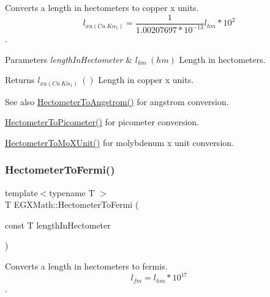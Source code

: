 Converts a length in hectometers to copper x units. \[ l_{xu(Cu\ K\alpha_1)}= \frac{1}{1.00207697*10^{-13}} l_{hm} * 10^{2}\]. 


\begin{DoxyParams}{Parameters}
{\em length\+In\+Hectometer} & $ l_{hm}\ (hm)$ Length in hectometers. \\
\hline
\end{DoxyParams}
\begin{DoxyReturn}{Returns}
$ l_{xu(Cu\ K\alpha_1)}\ ()$ Length in copper x units. 
\end{DoxyReturn}
\begin{DoxySeeAlso}{See also}
\mbox{\hyperlink{group___e_g_x_math-_conversions-_length_conversions-_s_i-_hectometer-_non-_s_i_gad1296c0169aa8a99802a30b65a2ea516}{Hectometer\+To\+Angstrom()}} for angstrom conversion. 

\mbox{\hyperlink{group___e_g_x_math-_conversions-_length_conversions-_s_i-_hectometer-_s_i_gaa45a09cd750ee4e48680332f0ce39f07}{Hectometer\+To\+Picometer()}} for picometer conversion. 

\mbox{\hyperlink{group___e_g_x_math-_conversions-_length_conversions-_s_i-_hectometer-_non-_s_i_gac2840604040746ae9a4c51fd1bb3e6f6}{Hectometer\+To\+Mo\+X\+Unit()}} for molybdenum x unit conversion. 
\end{DoxySeeAlso}
\mbox{\label{group___e_g_x_math-_conversions-_length_conversions-_s_i-_hectometer-_non-_s_i_gabd26977f3d5ad9d0560afb10be63a598}} 
\subsubsection{\texorpdfstring{Hectometer\+To\+Fermi()}{HectometerToFermi()}}
{\footnotesize\ttfamily template$<$typename T $>$ \\
T E\+G\+X\+Math\+::\+Hectometer\+To\+Fermi (\begin{DoxyParamCaption}\item[{const T}]{length\+In\+Hectometer }\end{DoxyParamCaption})}



Converts a length in hectometers to fermis. \[ l_{fm}=l_{hm} * 10^{17} \]. 


